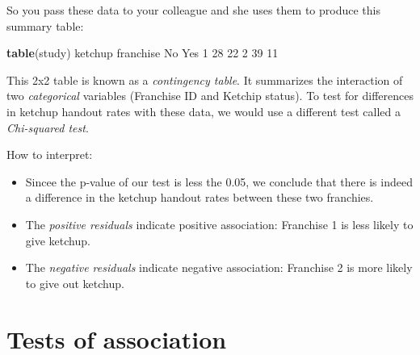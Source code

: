\documentclass[]{book}
\newenvironment{Shaded}{\begin{snugshade}}{\end{snugshade}}
\newcommand{\CommentTok}[1]{\textcolor[rgb]{0.56,0.35,0.01}{\textit{#1}}}
\newcommand{\DecValTok}[1]{\textcolor[rgb]{0.00,0.00,0.81}{#1}}
\newcommand{\FloatTok}[1]{\textcolor[rgb]{0.00,0.00,0.81}{#1}}
\newcommand{\KeywordTok}[1]{\textcolor[rgb]{0.13,0.29,0.53}{\textbf{#1}}}
\newcommand{\NormalTok}[1]{#1}
\newcommand{\OperatorTok}[1]{\textcolor[rgb]{0.81,0.36,0.00}{\textbf{#1}}}
\newcommand{\StringTok}[1]{\textcolor[rgb]{0.31,0.60,0.02}{#1}}
\begin{document}
So you pass these data to your colleague and she uses them to produce this summary table:

\begin{Shaded}
\begin{Highlighting}[]
\KeywordTok{table}\NormalTok{(study)}
\NormalTok{         ketchup}
\NormalTok{franchise No Yes}
        \DecValTok{1} \DecValTok{28}  \DecValTok{22}
        \DecValTok{2} \DecValTok{39}  \DecValTok{11}
\end{Highlighting}
\end{Shaded}

This 2x2 table is known as a \emph{contingency table}. It summarizes the interaction of two \emph{categorical} variables (Franchise ID and Ketchip status). To test for differences in ketchup handout rates with these data, we would use a different test called a \emph{Chi-squared test}.

\begin{Shaded}
\end{Shaded}

How to interpret:

\begin{itemize}
\item
  Sincee the p-value of our test is less the 0.05, we conclude that there is indeed a difference in the ketchup handout rates between these two franchies.
\item
  The \emph{positive residuals} indicate positive association: Franchise 1 is less likely to give ketchup.
\item
  The \emph{negative residuals} indicate negative association: Franchise 2 is more likely to give out ketchup.
\end{itemize}

\hypertarget{tests-of-association}{%
\section*{Tests of association}\label{tests-of-association}}
\end{document}
